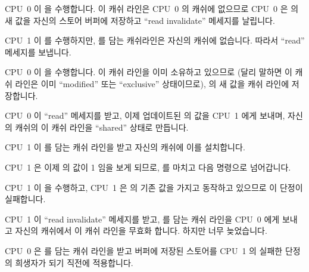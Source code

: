 \begin{sequence}
\item	CPU~0 이  을 수행합니다.  이 캐쉬 라인은 CPU~0 의 캐쉬에
	없으므로 CPU~0 은  의 새 값을 자신의 스토어 버퍼에 저장하고
	``read invalidate'' 메세지를 날립니다.
	\label{seq:app:whymb:Store Buffers and Memory Barriers}
\item	CPU~1 이  를 수행하지만,  를 담는
	캐쉬라인은 자신의 캐쉬에 없습니다.
	따라서 ``read'' 메세지를 보냅니다.
\item	CPU~0 이  을 수행합니다.
	이 캐쉬 라인을 이미 소유하고 있으므로 (달리 말하면 이 캐쉬 라인은 이미
	``modified'' 또는 ``exclusive'' 상태이므로),  의 새 값을 캐쉬
	라인에 저장합니다.
\item	CPU~0 이 ``read'' 메세지를 받고, 이제 업데이트된  의 값을 CPU~1
	에게 보내며, 자신의 캐쉬의 이 캐쉬 라인을 ``shared'' 상태로 만듭니다.

\iffalse

\item	CPU~0 executes \co{a = 1}.  The cache line is not in
	CPU~0's cache, so CPU~0 places the new value of \qco{a} in its
	store buffer and transmits a ``read invalidate'' message.
	\label{seq:app:whymb:Store Buffers and Memory Barriers}
\item	CPU~1 executes \co{while (b == 0) continue}, but the cache line
	containing \qco{b} is not in its cache.
	It therefore transmits a ``read'' message.
\item	CPU~0 executes \co{b = 1}.
	It already owns this cache line (in other words, the cache line
	is already in either the ``modified'' or the ``exclusive'' state),
	so it stores the new value of \qco{b} in its cache line.
\item	CPU~0 receives the ``read'' message, and transmits the
	cache line containing the now-updated value of \qco{b}
	to CPU~1, also marking the line as ``shared'' in its own cache.

\fi

\item	CPU~1 이  를 담는 캐쉬 라인을 받고 자신의 캐쉬에 이를
	설치합니다.
\item	CPU~1 은 이제  의 값이 1 임을 보게 되므로,
	 를 마치고 다음 명령으로 넘어갑니다.
\item	CPU~1 이  을 수행하고, CPU~1 은  의 기존 값을
	가지고 동작하고 있으므로 이 단정이 실패합니다.
\item	CPU~1 이 ``read invalidate'' 메세지를 받고,  를 담는 캐쉬 라인을
	CPU~0 에게 보내고 자신의 캐쉬에서 이 캐쉬 라인을 무효화 합니다.
	하지만 너무 늦었습니다.
\item	CPU~0 은  를 담는 캐쉬 라인을 받고 버퍼에 저장된 스토어를 CPU~1
	의 실패한 단정의 희생자가 되기 직전에 적용합니다.


\end{sequence}
